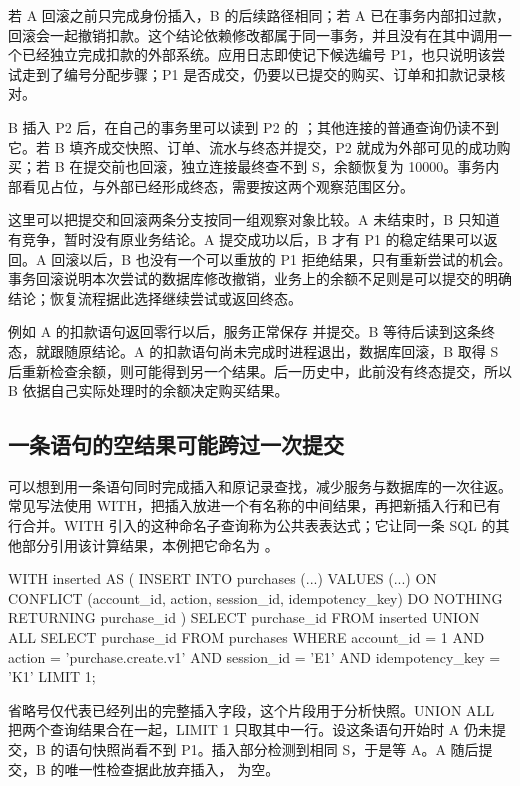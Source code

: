 若 A 回滚之前只完成身份插入，B 的后续路径相同；若 A 已在事务内部扣过款，回滚会一起撤销扣款。这个结论依赖修改都属于同一事务，并且没有在其中调用一个已经独立完成扣款的外部系统。应用日志即使记下候选编号 P1，也只说明该尝试走到了编号分配步骤；P1 是否成交，仍要以已提交的购买、订单和扣款记录核对。

B 插入 P2 后，在自己的事务里可以读到 P2 的 ；其他连接的普通查询仍读不到它。若 B 填齐成交快照、订单、流水与终态并提交，P2 就成为外部可见的成功购买；若 B 在提交前也回滚，独立连接最终查不到 S，余额恢复为 10000。事务内部看见占位，与外部已经形成终态，需要按这两个观察范围区分。

这里可以把提交和回滚两条分支按同一组观察对象比较。A 未结束时，B 只知道有竞争，暂时没有原业务结论。A 提交成功以后，B 才有 P1 的稳定结果可以返回。A 回滚以后，B 也没有一个可以重放的 P1 拒绝结果，只有重新尝试的机会。事务回滚说明本次尝试的数据库修改撤销，业务上的余额不足则是可以提交的明确结论；恢复流程据此选择继续尝试或返回终态。



例如 A 的扣款语句返回零行以后，服务正常保存  并提交。B 等待后读到这条终态，就跟随原结论。A 的扣款语句尚未完成时进程退出，数据库回滚，B 取得 S 后重新检查余额，则可能得到另一个结果。后一历史中，此前没有终态提交，所以 B 依据自己实际处理时的余额决定购买结果。

\subsection*{一条语句的空结果可能跨过一次提交}

可以想到用一条语句同时完成插入和原记录查找，减少服务与数据库的一次往返。常见写法使用 WITH，把插入放进一个有名称的中间结果，再把新插入行和已有行合并。WITH 引入的这种命名子查询称为公共表表达式；它让同一条 SQL 的其他部分引用该计算结果，本例把它命名为 。

\begin{BookCode}
WITH inserted AS (
  INSERT INTO purchases (...)
  VALUES (...)
  ON CONFLICT (account_id, action, session_id, idempotency_key)
  DO NOTHING
  RETURNING purchase_id
)
SELECT purchase_id FROM inserted
UNION ALL
SELECT purchase_id FROM purchases
WHERE account_id = 1
  AND action = 'purchase.create.v1'
  AND session_id = 'E1'
  AND idempotency_key = 'K1'
LIMIT 1;
\end{BookCode}

省略号仅代表已经列出的完整插入字段，这个片段用于分析快照。UNION ALL 把两个查询结果合在一起，LIMIT 1 只取其中一行。设这条语句开始时 A 仍未提交，B 的语句快照尚看不到 P1。插入部分检测到相同 S，于是等 A。A 随后提交，B 的唯一性检查据此放弃插入， 为空。

